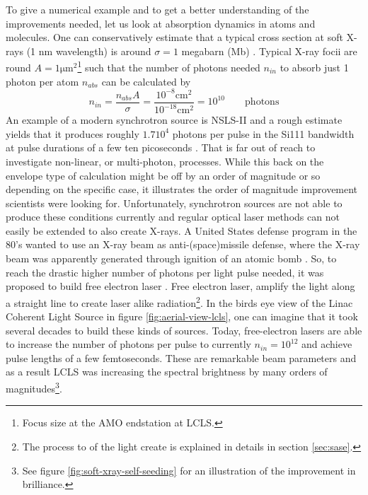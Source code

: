 To give a numerical example and to get a better understanding of the improvements needed, let us look at absorption dynamics in atoms and molecules. One can conservatively estimate that a typical cross section at soft X-rays (1 nm wavelength) is around $\sigma = 1$ megabarn (Mb) \cite{Bucksbaum-2011-Book}. Typical X-ray focii are round $A = 1 \mathrm{\mu m}^{2}$\footnote{Focus size at the AMO endstation at LCLS.} such that the number of photons needed $n_{in}$ to absorb just 1 photon per atom $n_{abs}$ can be calculated by
\begin{equation}
n_{in} = \frac{n_{abs} A}{\sigma} = \frac{10^{-8} \mathrm{cm}^{2}}{10^{-18} \mathrm{cm}^{2}}=10^{10}\qquad \mathrm{photons}
\label{eq:absorption-cross-section}
\end{equation}
An example of a modern synchrotron source is NSLS-II and a rough estimate yields that it produces roughly $1.7 10^{4}$ photons per pulse in the Si111 bandwidth at pulse durations of a few ten picoseconds \cite{Williams-2016-PC}. That is far out of reach to investigate non-linear, or multi-photon, processes. While this back on the envelope type of calculation might be off by an order of magnitude or so depending on the specific case, it illustrates the order of magnitude improvement scientists were looking for. Unfortunately, synchrotron sources are not able to produce these conditions currently and regular optical laser methods can not easily be extended to also create X-rays. A United States defense program in the 80's wanted to use an X-ray beam as anti-(space)missile defense, where the X-ray beam was apparently generated through ignition of an atomic bomb \cite{Hecht-2008-OPN}. So, to reach the drastic higher number of photons per light pulse needed, it was proposed to build free electron laser \cite{Kondratenko-1980-PA,Bonifacio-1984-OC}. Free electron laser, amplify the light along a straight line to create laser alike radiation\footnote{The process to of the light create is explained in details in section \ref{sec:sase}.}. In the birds eye view of the Linac Coherent Light Source in figure \ref{fig:aerial-view-lcls}, one can imagine that it took several decades to build these kinds of sources. Today, free-electron lasers are able to increase the number of photons per pulse to currently $n_{in} = 10^{12}$ and achieve pulse lengths of a few femtoseconds. These are remarkable beam parameters and as a result LCLS was increasing the spectral brightness by many orders of magnitudes\footnote{See figure \ref{fig:soft-xray-self-seeding} for an illustration of the improvement in brilliance.}.
